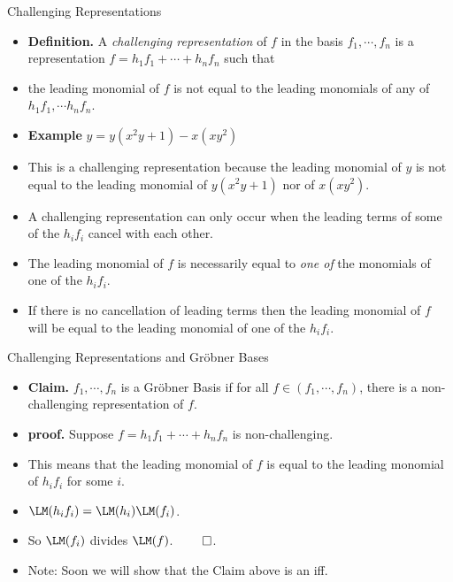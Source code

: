 \documentclass{beamer}
\begin{document}
\begin{frame}{Challenging Representations}

\begin{itemize}
  \item \textbf{Definition.} A \emph{challenging representation} of $f$ in the basis
  $f_1,\cdots,f_n$ is a representation $f=h_1f_1 + \cdots + h_n f_n$ such that
  \item the leading monomial of $f$ is not equal to the leading monomials of
  any of $h_1 f_1, \cdots h_n f_n$.
  \item \textbf{Example} $y = y(x^2y+1) -x(xy^2)$
  \item This is a challenging representation because the leading monomial of $y$ is not
  equal to the leading monomial of $y(x^2y+1)$ nor of $x(xy^2)$.
  \item A challenging representation can only occur when the leading terms
  of some of the $h_i f_i$ cancel with each other.
  \item The leading monomial of $f$ is necessarily equal to \emph{one of}
  the monomials of one of the $h_i f_i$.
  \item If there is no cancellation of leading terms then the leading monomial of $f$
  will be equal to the leading monomial of one of the $h_i f_i$.
\end{itemize}
\end{frame}
\begin{frame}{Challenging Representations and Gr\"{o}bner Bases}

\begin{itemize}
  \item \textbf{Claim.} $f_1,\cdots,f_n$ is a Gr\"{o}bner Basis if
  for all $f\in (f_1,\cdots,f_n)$, there is a non-challenging representation of $f$.
  \item \textbf{proof.} Suppose $f=h_1 f_1 + \cdots + h_n f_n$ is non-challenging.
  \item This means that the leading monomial of $f$ is equal to the leading monomial
  of $h_i f_i$ for some $i$.
  \item $\LM(h_i f_i) = \LM(h_i) \LM(f_i)$.
  \item So $\LM(f_i)$ divides $\LM(f)$. $\qed$.
  \item Note: Soon we will show that the Claim above is an iff.
\end{itemize}
\end{frame}
\end{document}
